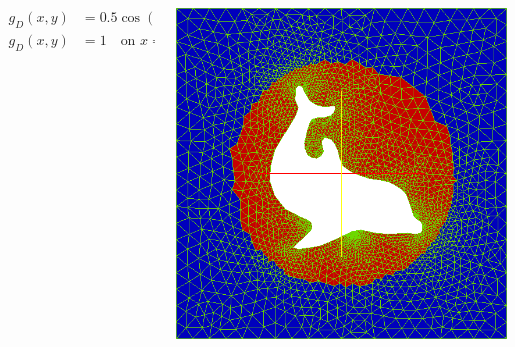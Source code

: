 \begin{frame}[shrink=35]
\begin{columns}[c]
\begin{column}{0.5\textwidth}
\begin{itemize}
\begin{align*}
            g_D(x,y) &= 0.5 \cos(2\pi y) \quad \text{on } x = 0 \\
            g_D(x,y) &= 1 \quad \text{on } x = 1 \\
          \end{align*}
      \end{itemize}
    \end{column}
    \begin{column}{0.5\textwidth}
      \begin{center}
        \includegraphics[width=1.0\textwidth]{png/poisson_5_subdomains.png}
      \end{center}
    \end{column}
  \end{columns}
\end{frame}

